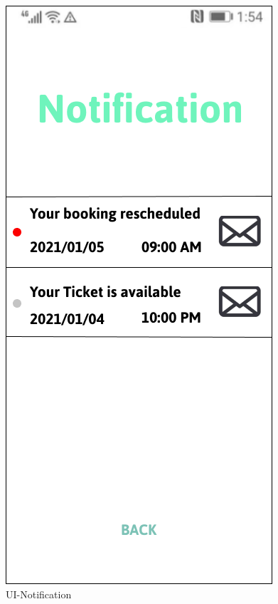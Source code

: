 \documentclass[a4paper,12pt]{report}
\begin{document}
\begin{figure}[H]
\begin{minipage}[t]{0.56\linewidth}
		\includegraphics[scale=0.5]{UI-Notification}
		\caption{UI-Notification}
		\label{fig:UI-Notification}
	\end{minipage}
\end{figure}
\end{document}
